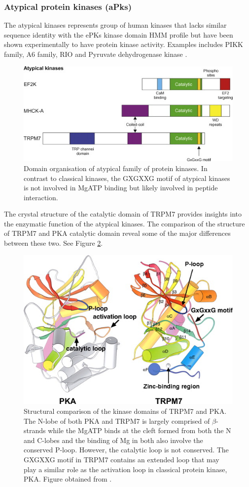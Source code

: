\documentclass[a4paper, 11pt]{article}
\begin{document}
\subsubsection*{Atypical protein kinases (aPks)}
The atypical kinases represents group of human kinases that lacks similar sequence identity with the ePKs kinase domain HMM profile but have been shown experimentally to have protein kinase activity. Examples includes PIKK family, A6 family, RIO and Pyruvate dehydrogenase kinase \cite{manning2002protein}.\\ 
\begin{figure}[H]
	\includegraphics[width=.8\linewidth]{figures/atypical.jpg}
	\centering
	\caption{Domain organisation of atypical family of protein kinases. In contrast to classical kinases, the GXGXXG motif of atypical kinases is not involved in MgATP binding but likely involved in peptide interaction.}
	\label{atypical}
\end{figure}
The crystal structure of the catalytic domain of TRPM7 provides insights into the enzymatic function of the atypical kinases. The comparison of the structure of TRPM7 and PKA catalytic domain reveal some of the major differences between these two. See Figure \ref{atypical2}. 
\begin{figure}[H]
	\includegraphics[width=.6\linewidth]{figures/atypical2.jpg}
	\centering
	\caption{Structural comparison of the kinase domains of TRPM7 and PKA. The N-lobe of both PKA and TRPM7 is largely comprised of $\beta$-strands while the MgATP binds at the cleft formed from both the N and C-lobes and the binding of Mg in both also involve the conserved P-loop. However, the catalytic loop is not conserved. The GXGXXG motif in TRPM7 contains an extended loop that may play a similar role as the activation loop in classical protein kinase, PKA. Figure obtained from \cite{wiseman2010ef2k}.} 
	\label{atypical2}
\end{figure}
\end{document}
